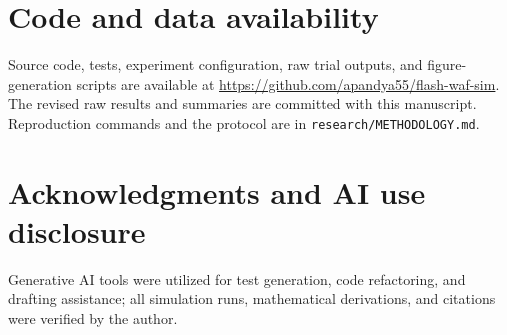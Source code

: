 \documentclass[11pt]{article}
\begin{document}
\section*{Code and data availability}
Source code, tests, experiment configuration, raw trial outputs, and figure-generation scripts are available at \url{https://github.com/apandya55/flash-waf-sim}. The revised raw results and summaries are committed with this manuscript. Reproduction commands and the protocol are in \texttt{research/METHODOLOGY.md}.

\section*{Acknowledgments and AI use disclosure}
Generative AI tools were utilized for test generation, code refactoring, and drafting assistance; all simulation runs, mathematical derivations, and citations were verified by the author.



\end{document}
